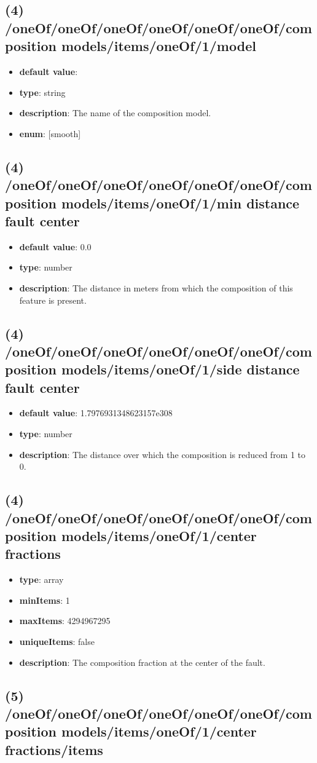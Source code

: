 \subsection{(4) /oneOf/oneOf/oneOf/oneOf/oneOf/oneOf/composition models/items/oneOf/1/model}
\begin{itemize}[leftmargin=4em]\item {\bf default value}: 
\item {\bf type}: string
\item {\bf description}: The name of the composition model.
\item {\bf enum}: [smooth]\end{itemize}\subsection{(4) /oneOf/oneOf/oneOf/oneOf/oneOf/oneOf/composition models/items/oneOf/1/min distance fault center}
\begin{itemize}[leftmargin=4em]\item {\bf default value}: 0.0
\item {\bf type}: number
\item {\bf description}: The distance in meters from which the composition of this feature is present.
\end{itemize}\subsection{(4) /oneOf/oneOf/oneOf/oneOf/oneOf/oneOf/composition models/items/oneOf/1/side distance fault center}
\begin{itemize}[leftmargin=4em]\item {\bf default value}: 1.7976931348623157e308
\item {\bf type}: number
\item {\bf description}: The distance over which the composition is reduced from 1 to 0.
\end{itemize}\subsection{(4) /oneOf/oneOf/oneOf/oneOf/oneOf/oneOf/composition models/items/oneOf/1/center fractions}
\begin{itemize}[leftmargin=4em]\item {\bf type}: array
\item {\bf minItems}: 1
\item {\bf maxItems}: 4294967295
\item {\bf uniqueItems}: false
\item {\bf description}: The composition fraction at the center of the fault.
\end{itemize}\subsection{(5) /oneOf/oneOf/oneOf/oneOf/oneOf/oneOf/composition models/items/oneOf/1/center fractions/items}
